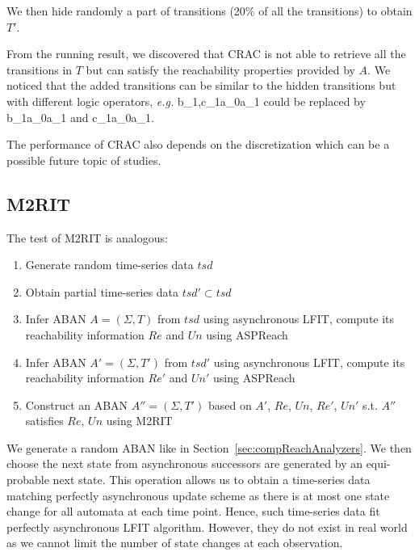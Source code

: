 We then hide randomly a part of transitions (20\% of all the transitions) to obtain $T'$. %

From the running result, we discovered that CRAC is not able to retrieve all the transitions in $T$ but can satisfy the reachability properties provided by $A$.
We noticed that the added transitions can be similar to the hidden transitions but with different logic operators, \textit{e.g.} \ac{b_1,c_1}{a_0}{a_1} could be replaced by \ac{b_1}{a_0}{a_1} and \ac{c_1}{a_0}{a_1}.

The performance of CRAC also depends on the discretization  which can be a possible future topic of studies.


\subsection{M2RIT}
The test of M2RIT is analogous:
\begin{enumerate}
    \item Generate random time-series data $tsd$
    \item Obtain partial time-series data $tsd'\subset tsd$
    \item Infer ABAN $A=(\Sigma, T)$ from $tsd$ using asynchronous LFIT, compute its reachability information $Re$ and $Un$ using ASPReach
    \item Infer ABAN $A'=(\Sigma, T')$ from $tsd'$ using asynchronous LFIT, compute its reachability information $Re'$ and $Un'$ using ASPReach
    \item Construct an ABAN $A''=(\Sigma, T')$ based on $A'$, $Re$, $Un$, $Re'$, $Un'$ s.t. $A''$ satisfies $Re$, $Un$ using M2RIT
\end{enumerate}
We generate a random ABAN like in Section~\ref{sec:compReachAnalyzers}.
We then choose the next state from asynchronous successors are generated by an equi-probable next state.
This operation allows us to obtain a time-series data matching perfectly asynchronous update scheme as there is at most one state change for all automata at each time point. 
Hence, such time-series data fit perfectly asynchronous LFIT algorithm.
However, they do not exist in real world as we cannot limit the number of state changes at each observation.


